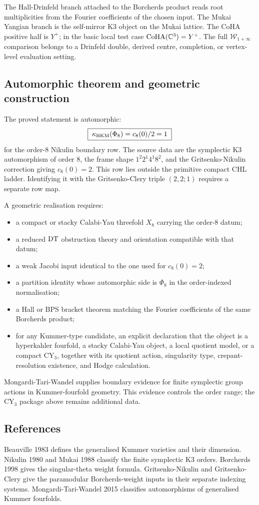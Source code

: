 The Hall-Drinfeld branch attached to the Borcherds product reads root
multiplicities from the Fourier coefficients of the chosen input. The
Mukai Yangian branch is the self-mirror K3 object on the Mukai lattice.
The CoHA positive half is $Y^+$; in the basic local test case
\(\operatorname{CoHA}(\mathbb{C}^3)=Y^+\). The full
$\mathcal W_{1+\infty}$ comparison belongs to a Drinfeld double,
derived centre, completion, or vertex-level evaluation setting.

\subsection*{Automorphic theorem and geometric construction}

The proved statement is automorphic:
\[
  \boxed{\;\kappa_{\mathrm{BKM}}(\Phi_8)=c_8(0)/2=1\;}
\]
for the order-$8$ Nikulin boundary row. The source data are the
symplectic K3 automorphism of order $8$, the frame shape
$1^2 2^1 4^1 8^2$, and the Gritsenko-Nikulin correction giving
$c_8(0)=2$. This row lies outside the primitive compact CHL ladder.
Identifying it with the Gritsenko-Clery triple \((2,2;1)\) requires a
separate row map.

A geometric realisation requires:
\begin{itemize}
\item a compact or stacky Calabi-Yau threefold $X_8$ carrying the
      order-$8$ datum;
\item a reduced $\mathrm{DT}$ obstruction theory and orientation compatible
      with that datum;
\item a weak Jacobi input identical to the one used for $c_8(0)=2$;
\item a partition identity whose automorphic side is $\Phi_8$ in the
      order-indexed normalisation;
\item a Hall or BPS bracket theorem matching the Fourier coefficients
      of the same Borcherds product;
\item for any Kummer-type candidate, an explicit declaration that the
      object is a hyperkahler fourfold, a stacky Calabi-Yau object, a
      local quotient model, or a compact CY$_3$, together with its
      quotient action, singularity type, crepant-resolution existence, and
      Hodge calculation.
\end{itemize}
Mongardi-Tari-Wandel supplies boundary evidence for finite symplectic
group actions in Kummer-fourfold geometry. This evidence controls the
order range; the CY$_3$ package above remains additional data.

\subsection*{References}

Beauville 1983 defines the generalised Kummer varieties and their
dimension. Nikulin 1980 and Mukai 1988 classify the finite symplectic
K3 orders. Borcherds 1998 gives the singular-theta weight formula.
Gritsenko-Nikulin and Gritsenko-Clery give the paramodular
Borcherds-weight inputs in their separate indexing systems.
Mongardi-Tari-Wandel 2015 classifies automorphisms of generalised
Kummer fourfolds.
